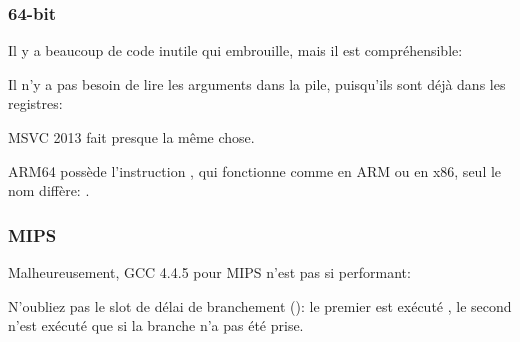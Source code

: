 \subsubsection{64-bit}



Il y a beaucoup de code inutile qui embrouille, mais il est compréhensible:




Il n'y a pas besoin de lire les arguments dans la pile, puisqu'ils sont déjà dans
les registres:



MSVC 2013 fait presque la même chose.


ARM64 possède l'instruction , qui fonctionne comme  en ARM ou
 en x86, seul le nom diffère:
.



\subsubsection{MIPS}

Malheureusement, GCC 4.4.5 pour MIPS n'est pas si performant:



N'oubliez pas le slot de délai de branchement (): le premier
 est exécuté  , le second  n'est exécuté
que si la branche n'a pas été prise.

